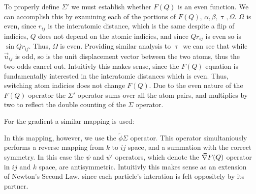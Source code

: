 To properly define $\Sigma'$ we must establish whether $F(Q)$ is an even function.  
We can accomplish this by examining each of the portions of $F(Q)$, $\alpha, \beta ,\uptau, \Omega$.
$\Omega$ is even, since $r_{ij}$ is the interatomic distance, which is the same despite a flip of indicies, $Q$ does not depend on the atomic indicies, and since $Qr_{ij}$ is even so is $\sin{Qr_{ij}}$.  Thus, $\Omega$ is even.  Providing similar analysis to $\uptau$ we can see that while $\vec{u}_{ij}$ is odd, so is the unit displacement vector between the two atoms, thus the two odds cancel out.
Intuitivly this makes sense, since the $F(Q)$ equation is fundamentally interested in the interatomic distances which is even.  Thus, switching atom indicies does not change $F(Q)$.
Due to the even nature of the $F(Q)$ operator the $\Sigma'$ operator sums over all the atom pairs, and multiplies by two to reflect the double counting of the $\Sigma$ operator.

For the gradient a similar mapping is used:
\begin{figure}
\end{figure}

In this mapping, however, we use the $\tilde{\phi}\Sigma$ operator.  This operator simultaniously performs a reverse mapping from $k$ to $ij$ space, and a summation with the correct symmetry.  In this case the $\psi$ and $\psi'$ operators, which denote the $\vec{\nabla} F(Q)$ operator in $ij$ and $k$ space, are antisymmetric.  Intuitivly this makes sense as an extension of Newton's Second Law, since each particle's interation is felt oppositely by its partner.

